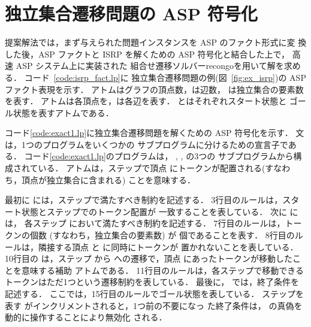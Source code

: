 \section{独立集合遷移問題の ASP 符号化}\label{sec:proposal}

 

 

提案解法では，まず与えられた問題インスタンスを ASP のファクト形式に変
換した後，ASP ファクトと ISRP を解くための ASP 符号化と結合した上で，
高速 ASP システム{\clingo}上に実装された
組合せ遷移ソルバー\textsf{recongo}を用いて解を求める．
%
コード~\ref{code:isrp_fact.lp}に
独立集合遷移問題の例(図~\ref{fig:ex_isrp})の ASP ファクト表現を示す．
%
アトムはグラフの頂点数，は辺数，
は独立集合の要素数を表す．
アトムは各頂点を，は各辺を表す．
とはそれぞれスタート状態と
ゴール状態を表すアトムである．

コード\ref{code:exact1.lp}に独立集合遷移問題を解くための ASP 符号化を示す．
文は，1つのプログラムをいくつかの
サブプログラムに分けるための宣言子である．
コード\ref{code:exact1.lp}のプログラムは，
, , の3つの
サブプログラムから構成されている．
アトムは，ステップで頂点
にトークンが配置される(すなわち，頂点が独立集合に含まれる)
ことを意味する．

最初に  には，ステップで満たすべき制約を記述する．
3行目のルールは，スタート状態とステップでのトークン配置が
一致することを表している．
次に  には，
各ステップ  において満たすべき制約を記述する．
7行目のルールは，トークンの個数 (すなわち，独立集合の要素数) が 
個であることを表す．
8行目のルールは，隣接する頂点  と  に同時にトークンが
置かれないことを表している．
10行目の は，ステップ  から 
への遷移で，頂点  にあったトークンが移動したことを意味する補助
アトムである．
11行目のルールは，各ステップで移動できる
トークンはただ1つという遷移制約を表している．
最後に， では，終了条件を記述する．
ここでは，15行目のルールでゴール状態を表している．
ステップを表す  がインクリメントされると，1つ前の不要になっ
た終了条件は， の真偽を動的に操作することにより無効化
される．

